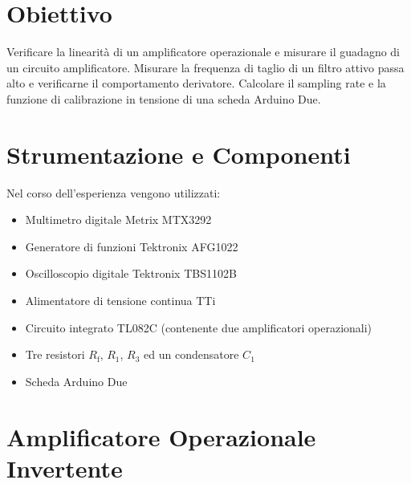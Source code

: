 \documentclass[a4paper,11pt]{article} %
\begin{document}
\section{Obiettivo}

Verificare la linearità di un amplificatore operazionale e misurare il guadagno di un circuito amplificatore. Misurare
la frequenza di taglio di un filtro attivo passa alto e verificarne il comportamento derivatore. Calcolare il sampling
rate e la funzione di calibrazione in tensione di una scheda Arduino Due.


\section{Strumentazione e Componenti}\label{s:strumenti}

Nel corso dell'esperienza vengono utilizzati:
\begin{itemize}
	\item Multimetro digitale Metrix MTX3292
	\item Generatore di funzioni Tektronix AFG1022
	\item Oscilloscopio digitale Tektronix TBS1102B
	\item Alimentatore di tensione continua TTi
	\item Circuito integrato TL082C (contenente due amplificatori operazionali)
	\item Tre resistori $R_{\text{f}}$, $R_{1}$, $R_{3}$ ed un condensatore $C_{1}$ 
	\item Scheda Arduino Due
\end{itemize}



\section{Amplificatore Operazionale Invertente}\label{s:opamp} 
\end{document}
